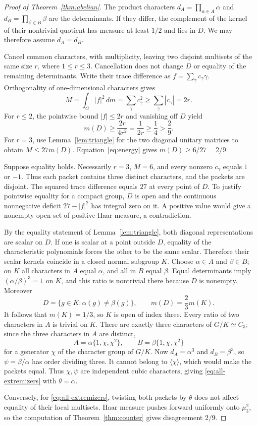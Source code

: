\documentclass[11pt]{article}
\theoremstyle{remark}\newtheorem{remark}[theorem]{Remark}
\begin{document}
\begin{proof}[Proof of Theorem~\ref{thm:abelian}]
The product characters $d_A=\prod_{\alpha\in A}\alpha$ and $d_B=\prod_{\beta\in B}\beta$ are the determinants. If they differ, the complement of the kernel of their nontrivial quotient has measure at least $1/2$ and lies in $D$. We may therefore assume $d_A=d_B$.

Cancel common characters, with multiplicity, leaving two disjoint multisets of the same size $r$, where $1\le r\le3$. Cancellation does not change $D$ or equality of the remaining determinants. Write their trace difference as $f=\sum_\gamma c_\gamma\gamma$. Orthogonality of one-dimensional characters gives
\begin{equation}\label{eq:energy}
 M=\int_G|f|^2\,dm=\sum_\gamma c_\gamma^2
 \ge\sum_\gamma|c_\gamma|=2r.
\end{equation}
For $r\le2$, the pointwise bound $|f|\le2r$ and vanishing off $D$ yield
\[
 m(D)\ge\frac{2r}{4r^2}=\frac1{2r}\ge\frac14>\frac29.
\]
For $r=3$, use Lemma~\ref{lem:triangle} for the two diagonal unitary matrices to obtain $M\le27m(D)$. Equation~\eqref{eq:energy} gives $m(D)\ge6/27=2/9$.

Suppose equality holds. Necessarily $r=3$, $M=6$, and every nonzero $c_\gamma$ equals $1$ or $-1$. Thus each packet contains three distinct characters, and the packets are disjoint. The squared trace difference equals $27$ at every point of $D$. To justify pointwise equality for a compact group, $D$ is open and the continuous nonnegative deficit $27-|f|^2$ has integral zero on it. A positive value would give a nonempty open set of positive Haar measure, a contradiction.

By the equality statement of Lemma~\ref{lem:triangle}, both diagonal representations are scalar on $D$. If one is scalar at a point outside $D$, equality of the characteristic polynomials forces the other to be the same scalar. Therefore their scalar kernels coincide in a closed normal subgroup $K$. Choose $\alpha\in A$ and $\beta\in B$; on $K$ all characters in $A$ equal $\alpha$, and all in $B$ equal $\beta$. Equal determinants imply $(\alpha/\beta)^3=1$ on $K$, and this ratio is nontrivial there because $D$ is nonempty. Moreover
\[
 D=\{g\in K:\alpha(g)\ne\beta(g)\},\qquad
 m(D)=\frac23m(K).
\]
It follows that $m(K)=1/3$, so $K$ is open of index three. Every ratio of two characters in $A$ is trivial on $K$. There are exactly three characters of $G/K\simeq C_3$; since the three characters in $A$ are distinct,
\[
 A=\alpha\{1,\chi,\chi^2\},\qquad
 B=\beta\{1,\chi,\chi^2\}
\]
for a generator $\chi$ of the character group of $G/K$. Now $d_A=\alpha^3$ and $d_B=\beta^3$, so $\psi=\beta/\alpha$ has order dividing three. It cannot belong to $\langle\chi\rangle$, which would make the packets equal. Thus $\chi,\psi$ are independent cubic characters, giving \eqref{eq:all-extremizers} with $\theta=\alpha$.

Conversely, for \eqref{eq:all-extremizers}, twisting both packets by $\theta$ does not affect equality of their local multisets. Haar measure pushes forward uniformly onto $\mu_3^2$, so the computation of Theorem~\ref{thm:counter} gives disagreement $2/9$.
\end{proof}
\end{document}

